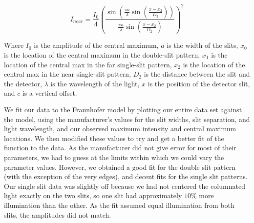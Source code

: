 \documentclass[prb,preprint]{revtex4-1}
\begin{document}
\begin{equation}
I_{near}= \frac{I_{0}}{4}(\frac{\sin(\frac{\pi a}{\lambda}\sin(\frac{x-x_{2}}{D_{2}}))}{\frac{\pi a}{\lambda}\sin(\frac{x-x_{2}}{D_{2}})})^{2} 
\end{equation}

Where $I_0$ is the amplitude of the central maximum, $a$ is the width of the slits, $x_0$ is the location of the central maximum in the double-slit pattern, $x_1$ is the location of the central max in the far single-slit pattern, $x_2$ is the location of the central max in the near single-slit pattern, $D_2$ is the distance between the slit and the detector, $\lambda$ is the wavelength of the light, $x$ is the position of the detector slit, and $c$ is a vertical offset. 

We fit our data to the Fraunhofer model by plotting our entire data set against the model, using the manufacturer's values for the slit widths, slit separation, and light wavelength, and our observed maximum intensity and central maximum locations.  We then modified these values to try and get a better fit of the function to the data.  As the manufacturer did not give error for most of their parameters, we had to guess at the limits within which we could vary the parameter values.  However, we obtained a good fit for the double slit pattern (with the exception of the very edges), and decent fits for the single slit patterns.  Our single slit data was slightly off because we had not centered the columnated light exactly on the two slits, so one slit had approximately $10\%$ more illumination than the other.  As the fit assumed equal illumination from both slits, the amplitudes did not match.  
\end{document}
